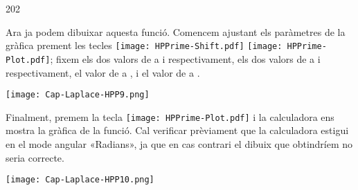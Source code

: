 \begin{exemple}
\begin{dingautolist}{202}
          \item Ara ja podem dibuixar aquesta funció. Comencem ajustant els paràmetres de la gràfica prement les tecles \texttt{[image: HPPrime-Shift.pdf]} \texttt{[image: HPPrime-Plot.pdf]}; fixem els dos valors de  a  i  respectivament, els dos valors de  a  i  respectivament, el valor de  a , i el valor de  a .

            \texttt{[image: Cap-Laplace-HPP9.png]}\vspace{5mm}

          \item Finalment, premem la tecla \texttt{[image: HPPrime-Plot.pdf]} i la calculadora ens mostra la gràfica de la funció. Cal verificar prèviament que la calculadora estigui en el mode angular «Radians», ja que en cas contrari el dibuix que obtindríem no seria correcte.

            \texttt{[image: Cap-Laplace-HPP10.png]}

    \end{dingautolist}

\end{exemple}
